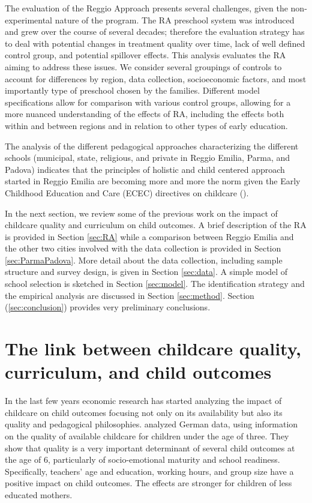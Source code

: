 \documentclass[12pt]{article}
\begin{document}
The evaluation of the Reggio Approach presents several challenges, given the non-experimental nature of the program. The RA preschool system was introduced and grew over the course of several decades; therefore the evaluation strategy has to deal with potential changes in treatment quality over time, lack of well defined control group, and potential spillover effects. This analysis evaluates the RA aiming to address these issues. We consider several groupings of controls to account for differences by region, data collection, socioeconomic factors, and most importantly type of preschool chosen by the families. Different model specifications allow for comparison with various control groups, allowing for a more nuanced understanding of the effects of RA, including the effects both within and between regions and in relation to other types of early education.

The analysis of the different pedagogical approaches characterizing the different schools (municipal, state, religious, and private in Reggio Emilia, Parma, and Padova) indicates that the principles of holistic and child centered approach started in Reggio Emilia are becoming more and more the norm given the Early Childhood Education and Care (ECEC) directives on childcare (\cite{Bennett2012}).

In the next section, we review some of the previous work on the impact of childcare quality and curriculum on child outcomes. A brief description of the RA is provided in Section \ref{sec:RA} while a comparison between Reggio Emilia and the other two cities involved with the data collection is provided in Section \ref{sec:ParmaPadova}. More detail about the data collection, including sample structure and survey design, is given in Section \ref{sec:data}. A simple model of school selection is sketched in Section \ref{sec:model}. The identification strategy and the empirical analysis are discussed in Section \ref{sec:method}. Section (\ref{sec:conclusion}) provides very preliminary conclusions.

\bigskip

\section{The link between childcare quality, curriculum, and child outcomes} \label{sec:lit}

In the last few years economic research has started analyzing the impact of childcare on child outcomes focusing not only on its availability but also its quality and pedagogical philosophies. \cite{Felfe2015a} analyzed German data, using information on the quality of available childcare for children under the age of three. They show that quality is a very important determinant of several child outcomes at the age of 6, particularly of socio-emotional maturity and school readiness. Specifically, teachers' age and education, working hours, and group size have a positive impact on child outcomes. The effects are stronger for children of less educated mothers.
\end{document}
